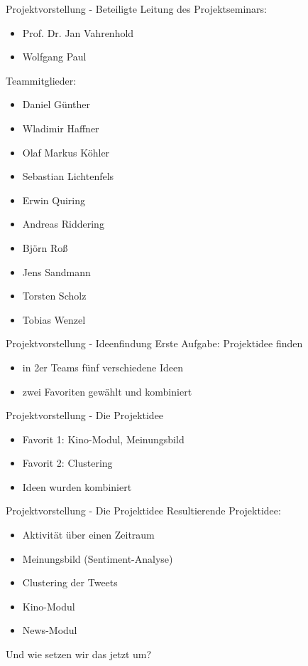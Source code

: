 \begin{frame}{Projektvorstellung - Beteiligte}
Leitung des Projektseminars:
\begin{itemize}
    \item Prof. Dr. Jan Vahrenhold
    \item Wolfgang Paul
\end{itemize}

Teammitglieder:
\begin{itemize}
    \item Daniel Günther
    \item Wladimir Haffner
    \item Olaf Markus Köhler
    \item Sebastian Lichtenfels
    \item Erwin Quiring
    \item Andreas Riddering
    \item Björn Roß 
    \item Jens Sandmann 
    \item Torsten Scholz
    \item Tobias Wenzel
\end{itemize}
\normalsize
\end{frame}


\begin{frame}{Projektvorstellung - Ideenfindung}
Erste Aufgabe: Projektidee finden
	\begin{itemize}
		\item in 2er Teams fünf verschiedene Ideen
		\item zwei Favoriten gewählt und kombiniert
	\end{itemize}
\end{frame}


\begin{frame}{Projektvorstellung - Die Projektidee}
	\begin{itemize}
		\item Favorit 1: Kino-Modul, Meinungsbild
		\item Favorit 2: Clustering
		\item Ideen wurden kombiniert
	\end{itemize}
\end{frame}


\begin{frame}{Projektvorstellung - Die Projektidee}
Resultierende Projektidee:
\begin{itemize}
 \item Aktivität über einen Zeitraum
 \item Meinungsbild (Sentiment-Analyse)
 \item Clustering der Tweets
 \item Kino-Modul
 \pause
 \item News-Modul
\end{itemize}
  Und wie setzen wir das jetzt um?
\end{frame}



